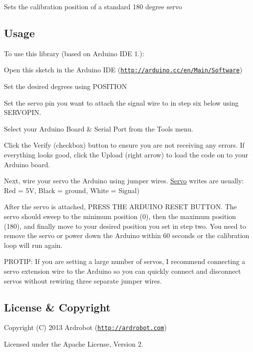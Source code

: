 Sets the calibration position of a standard 180 degree servo

\subsection*{Usage}

To use this library (based on Arduino I\-D\-E 1.)\-:


\begin{DoxyEnumerate}
\item Open this sketch in the Arduino I\-D\-E (\href{http://arduino.cc/en/Main/Software}{\tt http\-://arduino.\-cc/en/\-Main/\-Software})
\item Set the desired degrees using P\-O\-S\-I\-T\-I\-O\-N
\item Set the servo pin you want to attach the signal wire to in step six below using S\-E\-R\-V\-O\-P\-I\-N.
\item Select your Arduino Board \& Serial Port from the Tools menu.
\item Click the Verify (checkbox) button to ensure you are not receiving any errors. If everything looks good, click the Upload (right arrow) to load the code on to your Arduino board.
\item Next, wire your servo the Arduino using jumper wires. \hyperlink{class_servo}{Servo} writes are usually\-: Red = 5\-V, Black = ground, White = Signal)
\item After the servo is attached, P\-R\-E\-S\-S T\-H\-E A\-R\-D\-U\-I\-N\-O R\-E\-S\-E\-T B\-U\-T\-T\-O\-N. The servo should sweep to the minimum position (0), then the maximum position (180), and finally move to your desired position you set in step two. You need to remove the servo or power down the Arduino within 60 seconds or the calibration loop will run again.
\end{DoxyEnumerate}

P\-R\-O\-T\-I\-P\-: If you are setting a large number of servos, I recommend connecting a servo extension wire to the Arduino so you can quickly connect and disconnect servos without rewiring three separate jumper wires.

\subsection*{License \& Copyright}

Copyright (C) 2013 Ardrobot (\href{http://ardrobot.com}{\tt http\-://ardrobot.\-com})

Licensed under the Apache License, Version 2. 